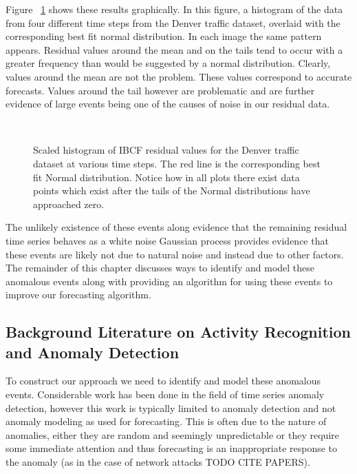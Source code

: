 Figure ~\ref{fig:denver_bcf_residual} shows these results graphically.  In this figure, a histogram of the data from four different time steps from the Denver traffic dataset, overlaid with the corresponding best fit normal distribution.  In each image the same pattern appears.  Residual values around the mean and on the tails tend to occur with a greater frequency than would be suggested by a normal distribution.  Clearly, values around the mean are not the problem.  These values correspond to accurate forecasts.  Values around the tail however are problematic and are further evidence of large events being one of the causes of noise in our residual data.

\begin{figure}[!t]
	\begin{center}
		 \\
	\end{center}
	\caption{Scaled histogram of IBCF residual values for the Denver traffic dataset at various time steps.  The red line is the corresponding best fit Normal distribution.  Notice how in all plots there exist data points which exist after the tails of the Normal distributions have approached zero.}
	\label{fig:denver_bcf_residual}
\end{figure}

The unlikely existence of these events along evidence that the remaining residual time series behaves as a white noise Gaussian process provides evidence that these events are likely not due to natural noise and instead due to other factors.  The remainder of this chapter discusses ways to identify and model these anomalous events along with providing an algorithm for using these events to improve our forecasting algorithm.


\subsection{Background Literature on Activity Recognition and Anomaly Detection}
To construct our approach we need to identify and model these anomalous events.  Considerable work has been done in the field of time series anomaly detection, however this work is typically limited to anomaly detection and not anomaly modeling as used for forecasting.  This is often due to the nature of anomalies, either they are random and seemingly unpredictable or they require some immediate attention and thus forecasting is an inappropriate response to the anomaly (as in the case of network attacks TODO CITE PAPERS).
   

